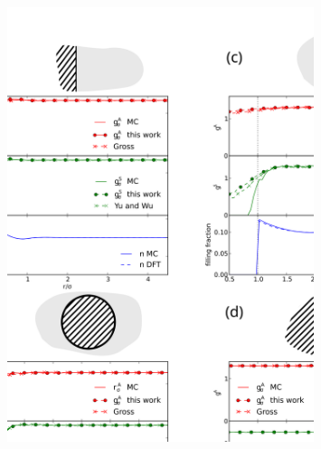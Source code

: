 \documentclass[letterpaper,twocolumn,amsmath,amssymb,pre]{revtex4-1}
\begin{document}


\begin{figure}
  \noindent\includegraphics[width=0.8\textwidth]{figs/low-density}

\end{figure}
\end{document}
